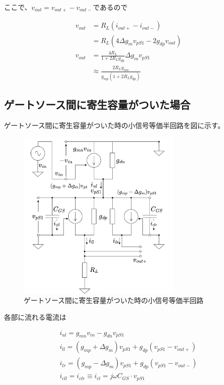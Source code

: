 \documentclass[twocolumn]{jsarticle}
\begin{document}
    ここで、$v_{out}=v_{out+}-v_{out-}$であるので

    \begin{align*}
        v_{out} &= R_{L}(i_{out+}-i_{out-}) \\
        &= R_{L}(4\Delta g_{m}v_{pS1}-2g_{dp}v_{out})   \\
        v_{out} &= \frac{4R_{L}}{1+2R_{L}g_{dp}}\Delta g_{m}v_{pS1}     \\
        &\approx \frac{2R_{L}g_{mn}}{g_{mp}(1+2R_{L}g_{dp})}    
    \end{align*}

    \newpage

    \subsection{ゲートソース間に寄生容量がついた場合}
        ゲートソース間に寄生容量がついた時の小信号等価半回路を図に示す。

        \begin{figure}[h]
            \begin{center}
                \includegraphics*[width=80mm]{figures/FoldedGilbert_GS_Half_Equivalent.png}
                \caption{ゲートソース間に寄生容量がついた時の小信号等価半回路}
                \label{fig:eq_gs}
            \end{center}
        \end{figure}

        各部に流れる電流は

        \begin{align*}
            i_{ul}=g_{mn}v_{in}-g_{dn}v_{pS1}   \\
            i_{ll}=(g_{mp}+\Delta g_{m})v_{pS1}+g_{dp}(v_{pS1}-v_{out+})    \\
            i_{lr}=(g_{mp}-\Delta g_{m})v_{pS1}+g_{dp}(v_{pS1}-v_{out-})    \\
            i_{cll} = i_{clr} \equiv i_{cl}=j\omega C_{GS}\cdot v_{pS1}
        \end{align*}
\end{document}
